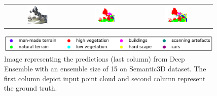 \begin{figure}[h!]
\begin{tabular}{ccc}
            \includegraphics[width=0.33\textwidth, height=0.18\textheight]{images/seg_output/sem3d_seg_output/3_RGB.pdf} &
            \includegraphics[width=0.33\textwidth, height=0.18\textheight]{images/seg_output/sem3d_seg_output/3_GT.pdf}& 
            \includegraphics[width=0.33\textwidth, height=0.18\textheight]{images/seg_output/sem3d_seg_output/3_Pred.pdf}\\
        \end{tabular}
        \includegraphics[scale=0.45]{images/legend.png}
        \caption{Image representing the predictions (last column) from Deep Ensemble with an ensemble size of 15 on Semantic3D dataset.
         The first column depict input point cloud and second column represent the ground truth.}
        \label{fig:deepensemble_vis_sem3d}
    \end{figure}

    
